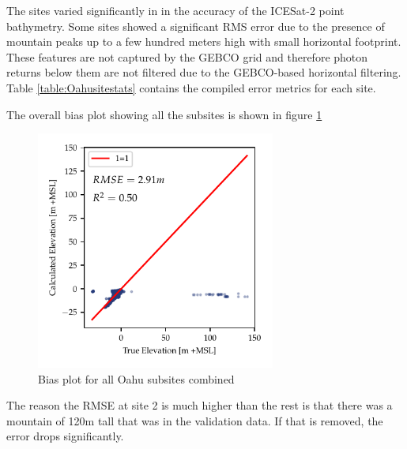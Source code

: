 The sites varied significantly in in the accuracy of the ICESat-2 point bathymetry. Some sites showed a significant RMS error due to the presence of mountain peaks up to a few hundred meters high with small horizontal footprint. These features are not captured by the GEBCO grid and therefore photon returns below them are not filtered due to the GEBCO-based horizontal filtering. Table \ref{table:Oahusitestats} contains the compiled error metrics for each site.

 



The overall bias plot showing all the subsites is shown in figure \ref{fig:oahu-all-bias-plot}

\begin{figure}[h]
    \centering
    \includegraphics[width=0.7\textwidth]{figures/Oahu_combined_lidar_estimated_vs_truth.pdf}
    \caption{Bias plot for all Oahu subsites combined}
    \label{fig:oahu-all-bias-plot}
\end{figure}

The reason the RMSE at site 2 is much higher than the rest is that there was a mountain of 120m tall that was in the validation data. If that is removed, the error drops significantly. 


